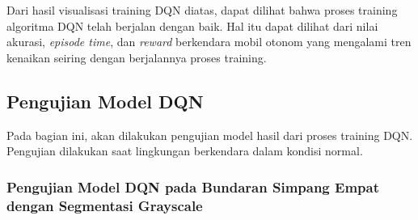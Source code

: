 \documentclass[conference]{IEEEtran}
\begin{document}
	Dari hasil visualisasi training DQN diatas, dapat dilihat bahwa proses training algoritma DQN telah berjalan dengan baik. Hal itu dapat dilihat dari nilai akurasi, \textit{episode time}, dan \textit{reward} berkendara mobil otonom yang mengalami tren kenaikan seiring dengan berjalannya proses training.
	
	\fi
	
	\subsection{Pengujian Model DQN}
	\label{sec:pengujian_model_dqn}
	
	Pada bagian ini, akan dilakukan pengujian model hasil dari proses training DQN. Pengujian dilakukan saat lingkungan berkendara dalam kondisi normal.
	
	\subsubsection{Pengujian Model DQN pada Bundaran Simpang Empat dengan Segmentasi Grayscale}
	\label{sec:pengujian_dqn_bundaran_simpangempat_segmentasi_grayscale}
	
\end{document}
